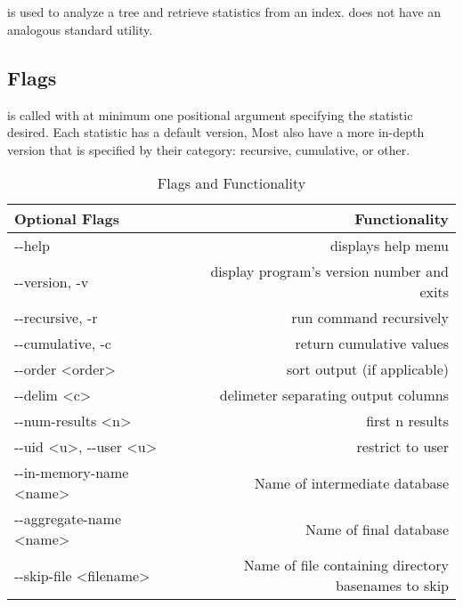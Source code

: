 \section{\gufistats}
\gufistats is used to analyze a tree and retrieve statistics from an
index. \gufistat does not have an analogous standard utility.

\subsection{Flags}
\gufistats is called with at minimum one positional argument
specifying the statistic desired. Each statistic has a default
version, Most also have a more in-depth version that is specified by
their category: recursive, cumulative, or other.

\begin{table}[h!]
  \centering
  \begin{tabular}{| l | r |}
    \hline
    Optional Flags & Functionality \\
    \hline
    -{}-help & displays help menu \\
    \hline
    -{}-version, -v & display program's version number and exits \\
    \hline
    -{}-recursive, -r & run command recursively \\
    \hline
    -{}-cumulative, -c & return cumulative values \\
    \hline
    -{}-order \textless order\textgreater & sort output (if applicable) \\
    \hline
    -{}-delim \textless c\textgreater & delimeter separating output
    columns \\
    \hline
    -{}-num-results \textless n\textgreater & first n results \\
    \hline
    -{}-uid \textless u\textgreater, -{}-user \textless u\textgreater & restrict to user \\
    \hline
    -{}-in-memory-name \textless name\textgreater & Name of intermediate
    database \\
    \hline
    -{}-aggregate-name \textless name\textgreater & Name of final
    database \\
    \hline
    -{}-skip-file \textless filename\textgreater & Name of file containing
    directory basenames to skip \\
    \hline
  \end{tabular}
  \caption{\label{fig:gufi_stats_flags} \gufistats Flags and Functionality}
\end{table}


